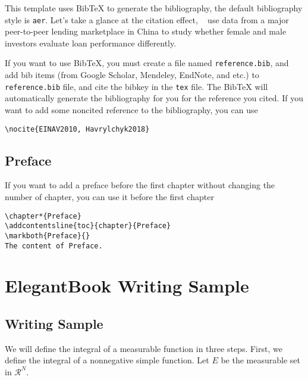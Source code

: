 \documentclass{elegantbook}
\begin{document}
This template uses Bib\TeX{} to generate the bibliography, the default bibliography style is \lstinline{aer}. Let's take a glance at the citation effect, ~\cite{Chen2018} use data from a major peer-to-peer lending marketplace in China to study whether female and male investors evaluate loan performance differently. 

If you want to use Bib\TeX{}, you must create a file named \lstinline{reference.bib}, and add bib items (from Google Scholar, Mendeley, EndNote, and etc.) to \lstinline{reference.bib} file, and cite the bibkey in the \lstinline{tex} file. The Bib\TeX{} will automatically generate the bibliography for you for the reference you cited. If you want to add some noncited reference to the bibliography, you can use 

\begin{lstlisting}
\nocite{EINAV2010, Havrylchyk2018} 
\end{lstlisting}

\section{Preface}

If you want to add a preface before the first chapter without changing the number of chapter, you can use it before the first chapter 

\begin{lstlisting}[frame=single]
\chapter*{Preface}
\addcontentsline{toc}{chapter}{Preface} 
\markboth{Preface}{} 
The content of Preface.
\end{lstlisting}

\chapter{ElegantBook Writing Sample}
\lipsum[1]

\section{Writing Sample}

We will define the integral of a measurable function in three steps. First, we define the integral of a nonnegative simple function. Let $E$ be the measurable set in $\mathcal{R}^N$.
\end{document}
